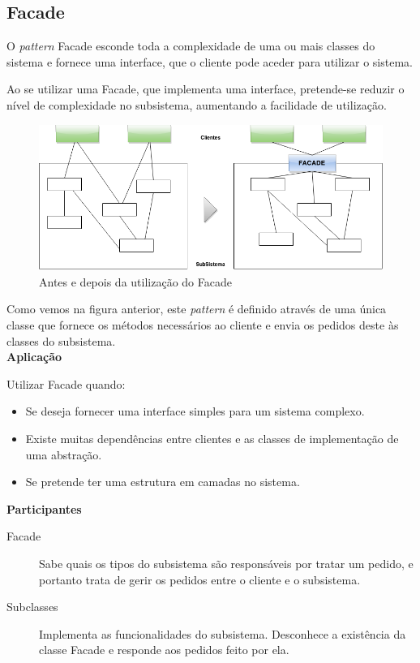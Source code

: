 \subsection{Facade}

O \textit{pattern} Facade esconde toda a complexidade de uma ou mais classes do sistema e fornece uma interface, que o cliente pode aceder  para utilizar o sistema.

Ao se utilizar uma Facade, que implementa uma interface, pretende-se reduzir o nível de complexidade no subsistema, aumentando a facilidade de utilização.\\

\begin{figure}[!h]
\centering
\includegraphics[scale=0.5]{img/facade-estrutura}
\caption{Antes e depois da utilização do Facade}
\end{figure}

Como vemos na figura anterior, este \textit{pattern} é definido através de uma única classe que fornece os métodos necessários ao cliente e envia os pedidos deste às classes do subsistema.\\

\textbf{Aplicação}

Utilizar Facade quando:

\begin{itemize}
  \item Se deseja fornecer uma interface simples para um sistema complexo.
  \item Existe muitas dependências entre clientes e as classes de implementação de uma abstração.
  \item Se pretende ter uma estrutura em camadas no sistema.\\
\end{itemize}

\textbf{Participantes}

\begin{description}
  \item[Facade] Sabe quais os tipos do subsistema são responsáveis por tratar um pedido, e portanto trata de gerir os pedidos entre o cliente e o subsistema.
  \item[Subclasses] Implementa as funcionalidades do subsistema. Desconhece a existência da classe Facade e responde aos pedidos feito por ela.\\
\end{description}

